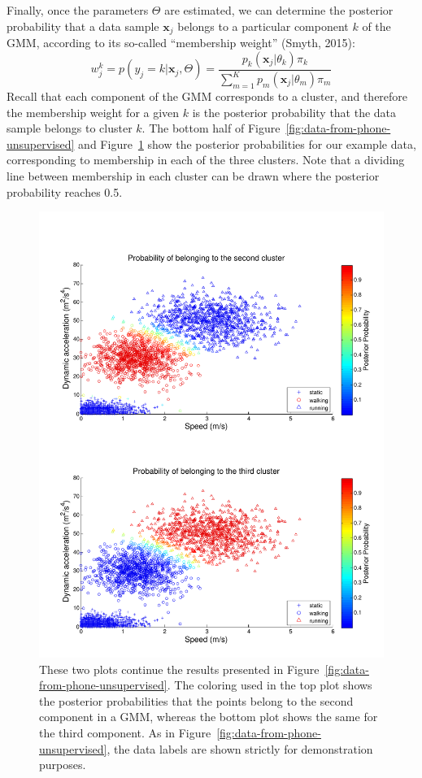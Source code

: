 Finally, once the parameters $\Theta$ are estimated, we can determine the posterior probability that a data sample $\mathbf{x}_j$ belongs to a particular component $k$ of the GMM, according to its so-called ``membership weight'' (Smyth, 2015):
%
\begin{equation}
  w_j^k = p(y_j = k|\mathbf{x}_j, \Theta) =  \frac{p_k(\mathbf{x}_j|\theta_k) \pi_k}{ \sum_{m=1}^K p_m(\mathbf{x}_j|\theta_m) \pi_m }
\end{equation}
%
Recall that each component of the GMM corresponds to a cluster, and therefore the membership weight for a given $k$ is the posterior probability that the data sample belongs to cluster $k$. The bottom half of Figure~\ref{fig:data-from-phone-unsupervised} and Figure~\ref{fig:data-from-phone-unsupervised2} show the posterior probabilities for our example data, corresponding to membership in each of the three clusters. Note that a dividing line between membership in each cluster can be drawn where the posterior probability reaches 0.5.
%
\begin{figure}
  \begin{center}
    \includegraphics[width=1.0\textwidth]{Images/figChapter3-3}
  \end{center}
  \caption[Further results from unsupervised learning]{These two plots continue the results presented in Figure~\ref{fig:data-from-phone-unsupervised}. The coloring used in the top plot shows the posterior probabilities that the points belong to the second component in a GMM, whereas the bottom plot shows the same for the third component. As in Figure~\ref{fig:data-from-phone-unsupervised}, the data labels are shown strictly for demonstration purposes.}
  \label{fig:data-from-phone-unsupervised2}
\end{figure}

